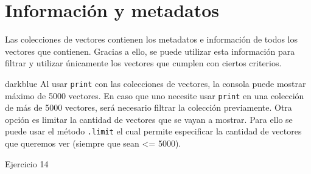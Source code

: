 \documentclass[
  12pt,
  letterpaper,
  twoside]{book}
\begin{document}
\hypertarget{informaciuxf3n-y-metadatos-2}{%
\section{Información y metadatos}\label{informaciuxf3n-y-metadatos-2}}

Las colecciones de vectores contienen los metadatos e información de todos los vectores que contienen. Gracias a ello, se puede utilizar esta información para filtrar y utilizar únicamente los vectores que cumplen con ciertos criterios.

\begin{bluebox2}

\begin{awesomeblock}{5pt}{\faLightbulb}{darkblue}
Al usar \texttt{print} con las colecciones de vectores, la consola puede mostrar máximo de 5000 vectores. En caso que uno necesite usar \texttt{print} en una colección de más de 5000 vectores, será necesario filtrar la colección previamente. Otra opción es limitar la cantidad de vectores que se vayan a mostrar. Para ello se puede usar el método \texttt{.limit} el cual permite especificar la cantidad de vectores que queremos ver (siempre que sean \textless= 5000).

\end{awesomeblock}

\end{bluebox2}

Ejercicio 14
\end{document}
